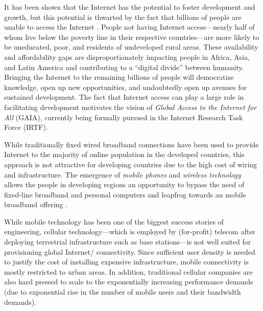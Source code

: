 \documentclass{sigcomm-alternate}
\begin{document}
It has been shown that the Internet has the potential to foster development and growth, but this potential is thwarted by the fact that billions of people are unable to access the Internet \cite{thanki2012economic}. People not having Internet access---nearly half of whom live below the poverty line in their respective countries---are more likely to be uneducated, poor, and residents of undeveloped rural areas. These availability and affordability gaps are disproportionately impacting people in Africa, Asia, and Latin America and contributing to a ``digital divide'' between humanity. Bringing the Internet to the remaining billions of people will democratize knowledge, open up new opportunities, and undoubtedly open up avenues for sustained development. The fact that Internet access can play a large role in facilitating development motivates the vision of \textit{Global Access to the Internet for All} (GAIA), currently being formally pursued in the Internet Research Task Force (IRTF). 









While traditionally fixed wired broadband connections have been used to provide Internet to the majority of online population in the developed countries, this approach is not attractive for developing countries due to the high cost of wiring and infrastructure. The emergence of \textit{mobile phones} and \textit{wireless technology} allows the people in developing regions an opportunity to bypass the need of fixed-line broadband and personal computers and leapfrog towards an mobile broadband offering \cite{gao2004wireless}. 

While mobile technology has been one of the biggest success stories of engineering, cellular technology---which is employed by (for-profit) telecom after deploying terrestrial infrastructure such as base stations---is not well suited for provisioning global Internet/ connectivity. Since sufficient user density is needed to justify the cost of installing expensive infrastructure, mobile connectivity is mostly restricted to urban areas. In addition, traditional cellular companies are also hard pressed to scale to the exponentially increasing performance demands (due to exponential rise in the number of mobile users and their bandwidth demands).
\end{document}
